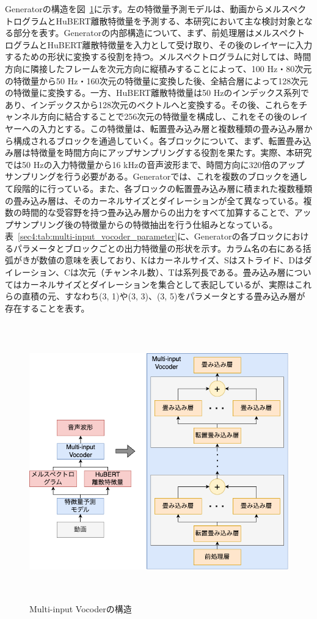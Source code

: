 \documentclass[12pt]{jarticle}
\numberwithin{equation}{section}    %
\numberwithin{figure}{section}      %
\numberwithin{table}{section}      %
\begin{document}
Generatorの構造を図~\ref{sec4:fig:multi-input_vocoder}に示す。左の特徴量予測モデルは、動画からメルスペクトログラムとHuBERT離散特徴量を予測する、本研究において主な検討対象となる部分を表す。Generatorの内部構造について、まず、前処理層はメルスペクトログラムとHuBERT離散特徴量を入力として受け取り、その後のレイヤーに入力するための形状に変換する役割を持つ。メルスペクトログラムに対しては、時間方向に隣接したフレームを次元方向に縦積みすることによって、100 Hz・80次元の特徴量から50 Hz・160次元の特徴量に変換した後、全結合層によって128次元の特徴量に変換する。一方、HuBERT離散特徴量は50 Hzのインデックス系列であり、インデックスから128次元のベクトルへと変換する。その後、これらをチャンネル方向に結合することで256次元の特徴量を構成し、これをその後のレイヤーへの入力とする。この特徴量は、転置畳み込み層と複数種類の畳み込み層から構成されるブロックを通過していく。各ブロックについて、まず、転置畳み込み層は特徴量を時間方向にアップサンプリングする役割を果たす。実際、本研究では50 Hzの入力特徴量から16 kHzの音声波形まで、時間方向に320倍のアップサンプリングを行う必要がある。Generatorでは、これを複数のブロックを通して段階的に行っている。また、各ブロックの転置畳み込み層に積まれた複数種類の畳み込み層は、そのカーネルサイズとダイレーションが全て異なっている。複数の時間的な受容野を持つ畳み込み層からの出力をすべて加算することで、アップサンプリング後の特徴量からの特徴抽出を行う仕組みとなっている。表~\ref{sec4:tab:multi-input_vocoder_parameter}に、Generatorの各ブロックにおけるパラメータとブロックごとの出力特徴量の形状を示す。カラム名の右にある括弧がきが数値の意味を表しており、Kはカーネルサイズ、Sはストライド、Dはダイレーション、Cは次元（チャンネル数）、Tは系列長である。畳み込み層についてはカーネルサイズとダイレーションを集合として表記しているが、実際はこれらの直積の元、すなわち(3, 1)や(3, 3)、(3, 5)をパラメータとする畳み込み層が存在することを表す。
\begin{figure}[bt]
    \centering
    \includegraphics[height=120mm]{./figure/sec4/model/multi-input_vocoder.png}
    \caption{Multi-input Vocoderの構造}
    \label{sec4:fig:multi-input_vocoder}
\end{figure}
\end{document}
